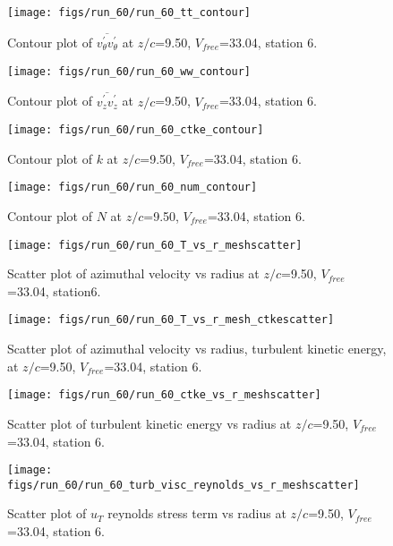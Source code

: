 \begin{figure}[H]
\centering
\texttt{[image: figs/run\_60/run\_60\_tt\_contour]}
\caption{Contour plot of $\overline{v_{\theta}^{\prime} v_{\theta}^{\prime}}$ at $z/c$=9.50, $V_{free}$=33.04, station 6.}
\end{figure}


\begin{figure}[H]
\centering
\texttt{[image: figs/run\_60/run\_60\_ww\_contour]}
\caption{Contour plot of $\overline{v_{z}^{\prime} v_{z}^{\prime}}$ at $z/c$=9.50, $V_{free}$=33.04, station 6.}
\end{figure}


\begin{figure}[H]
\centering
\texttt{[image: figs/run\_60/run\_60\_ctke\_contour]}
\caption{Contour plot of $k$ at $z/c$=9.50, $V_{free}$=33.04, station 6.}
\end{figure}


\begin{figure}[H]
\centering
\texttt{[image: figs/run\_60/run\_60\_num\_contour]}
\caption{Contour plot of $N$ at $z/c$=9.50, $V_{free}$=33.04, station 6.}
\end{figure}


\begin{figure}[H]
\centering
\texttt{[image: figs/run\_60/run\_60\_T\_vs\_r\_meshscatter]}
\caption{Scatter plot of azimuthal velocity vs radius at $z/c$=9.50, $V_{free}$=33.04, station6.}
\end{figure}


\begin{figure}[H]
\centering
\texttt{[image: figs/run\_60/run\_60\_T\_vs\_r\_mesh\_ctkescatter]}
\caption{Scatter plot of azimuthal velocity vs radius, turbulent kinetic energy, at $z/c$=9.50, $V_{free}$=33.04, station 6.}
\end{figure}


\begin{figure}[H]
\centering
\texttt{[image: figs/run\_60/run\_60\_ctke\_vs\_r\_meshscatter]}
\caption{Scatter plot of turbulent kinetic energy vs radius at $z/c$=9.50, $V_{free}$=33.04, station 6.}
\end{figure}


\begin{figure}[H]
\centering
\texttt{[image: figs/run\_60/run\_60\_turb\_visc\_reynolds\_vs\_r\_meshscatter]}
\caption{Scatter plot of $
u_T$ reynolds stress term vs radius at $z/c$=9.50, $V_{free}$=33.04, station 6.}
\end{figure}


